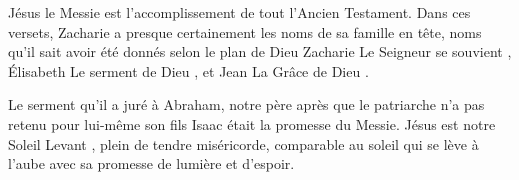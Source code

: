 Jésus le Messie est l'accomplissement de tout l'Ancien Testament. Dans ces versets, Zacharie a presque certainement les noms de sa famille en tête, noms qu'il sait avoir été donnés selon le plan de Dieu\frcolon{} Zacharie \ocadr \Og Le Seigneur se souvient \Fg{}, Élisabeth \ocadr \Og Le serment de Dieu \Fg{}, et Jean \ocadr \Og La Grâce de Dieu \Fg{}.

\Og Le serment qu’il a juré à Abraham, notre père \Fg{} après que le patriarche n'a pas retenu pour lui-même son fils Isaac était la promesse du Messie. Jésus est notre \Og Soleil Levant \Fg{}, plein de tendre miséricorde, comparable au soleil qui se lève à l'aube avec sa promesse de lumière et d'espoir.


